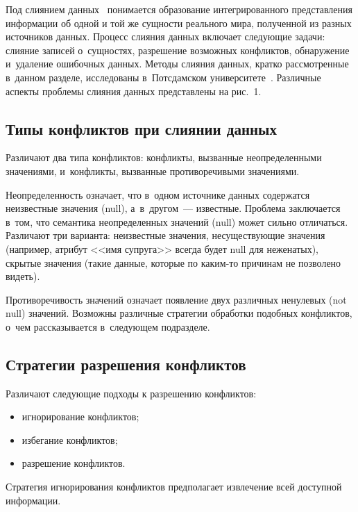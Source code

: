 \begin{multicols}{2}
  Под слиянием данных~\cite{6-vov, 12-vov, 11-vov} понимается образование
интегрированного представления информации об одной и той же сущности реального мира,
полученной из разных источников данных. Процесс слияния данных включает следующие
задачи: слияние записей о~сущностях, разрешение возможных конфликтов, обнаружение
и~удаление ошибочных данных. Методы слияния данных, кратко рассмотренные в~данном
разделе, исследованы в~Потсдамском университете~\cite{11-vov}. Различные аспекты
проблемы слияния данных представлены на рис.~1.


  \subsection{Типы конфликтов при слиянии данных}

  Различают два типа конфликтов: конфликты, вызванные неопределенными значениями,
и~конфликты, вызванные противоречивыми значе\-ниями.

  Неопределенность означает, что в~одном источнике данных содержатся неизвестные
значения (null), а~в~другом~--- известные. Проблема заключается в~том, что семантика
неопределенных значений (null) может сильно отличаться. Различают три варианта:
неизвестные значения, несуществующие значения (например, атрибут <<имя супруга>>
всегда будет null для неженатых), скрытые значения (такие данные, которые по ка\-ким-то
причинам не позволено видеть).

  Противоречивость значений означает появление двух различных ненулевых (not null)
значений. Возможны различные стратегии обработки подобных конфликтов, о~чем
рассказывается в~сле\-ду\-ющем подразделе.



  \subsection{Стратегии разрешения конфликтов}

  Различают следующие подходы к разрешению конфликтов:
  \begin{itemize}
\item игнорирование конфликтов;
\item избегание конфликтов;
\item разрешение конфликтов.
\end{itemize}

  Стратегия игнорирования конфликтов предполагает извлечение всей доступной
информации.\linebreak\vspace*{-12pt}

\pagebreak

\end{multicols}

